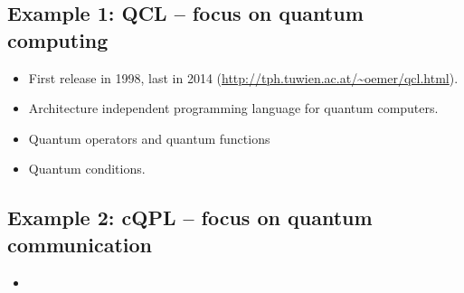 \documentclass{beamer}
\begin{document}
\subsection{Example 1: QCL -- focus on quantum computing}

\begin{frame}{\insertsection}{\insertsubsection}
	\begin{itemize}
		\item<1-> First release in 1998, last in 2014 
		(\url{http://tph.tuwien.ac.at/~oemer/qcl.html}).
		\item<2-> Architecture independent programming language for quantum 
		computers.
		\item<3-> Quantum operators and quantum functions
		\item<4-> Quantum conditions.
	\end{itemize}
	
\end{frame}

\begin{frame}{\insertsection}{\insertsubsection}
	
\end{frame}

\begin{frame}{\insertsection}{\insertsubsection}
	
\end{frame}

\begin{frame}{\insertsection}{\insertsubsection}
	
\end{frame}


\subsection{Example 2: cQPL -- focus on quantum communication}

\begin{frame}{\insertsection}{\insertsubsection}
    \begin{itemize}
        \item<1-> 
    \end{itemize}
\end{frame}
\end{document}
